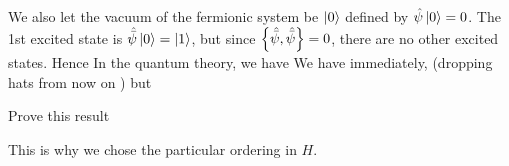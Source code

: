 \documentclass{article}
\begin{document}
\eq{
\comm[\hat{F}]{\hat{\psi}} &= -\hat{\psi} \\
\comm[\hat{F}]{\hat{\bar{\psi}}} &= \hat{\bar{\psi}}
}
We also let the vacuum of the fermionic system be $\ket{0}$ defined by $\hat{\psi}\ket{0}=0$. The 1st excited state is $\hat{\bar{\psi}}\ket{0} = \ket{1}$, but since $\acomm[\hat{\bar{\psi}}]{\hat{\bar{\psi}}}=0$, there are no other excited states. Hence 
In the quantum theory, we have 
We have immediately, (dropping hats from now on )
but 

\begin{ex}
Prove this result
\end{ex}

This is why we chose the particular ordering in $H$. 

\end{document}
